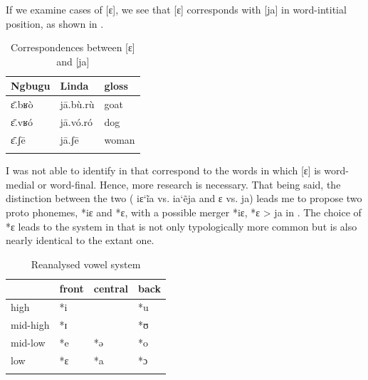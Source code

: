 \documentclass[output=paper,colorlinks,citecolor=brown]{langscibook}
\begin{document}
If we examine cases of [ɛ], we see that  [ɛ] corresponds with  [ja] \citep{Moñino1988} in word-intitial position, as shown in .

\begin{table}
\caption{Correspondences between  [ɛ] and  [ja]\label{tab:olson:13}}
    \begin{tabular}{lll}
    \lsptoprule
        Ngbugu & Linda & gloss\\
    \midrule
        ɛ̄.bʁò       & jā.bù.rù  & goat\\
        ɛ̄.vʁó       & jā.vó.ró & dog\\
        ɛ̄.ʃē        & jā.ʃē    & woman\\
    \lspbottomrule
 \end{tabular}
\end{table}

I was not able to identify  in  that correspond to the  words in which [ɛ] is word-medial or word-final. Hence, more research is necessary. That being said, the distinction between the two  ( iɛ\char`\~ia vs.  ia\char`\~eja and  ɛ vs.  ja) leads me to propose two proto phonemes, *iɛ and *ɛ, with a possible merger *iɛ, *ɛ > ja in . The choice of *ɛ leads to the  system in  that is not only typologically  more common but is also nearly identical to the extant  one.

\begin{table}
\caption{Reanalysed  vowel system}
\label{tab:olson:14}
 \begin{tabularx}{0.8\textwidth}{XXXX}
    \lsptoprule
                    & front & central   & back\\
    \midrule
        high        & *i    &           & *u\\
        mid-high    & *ɪ    &           & *ʊ\\
        mid-low     & *e    & *ə        & *o\\
        low         & *ɛ    & *a        & *ɔ\\
    \lspbottomrule
    \end{tabularx}
\end{table}
\end{document}
